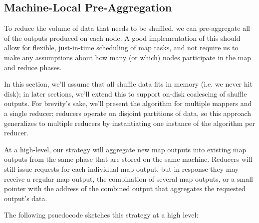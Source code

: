 \documentclass[12pt]{article}
\begin{document}
\subsection{Machine-Local Pre-Aggregation}

To reduce the volume of data that needs to be shuffled, we can pre-aggregate
all of the outputs produced on each node.  A good implementation of this
should allow for flexible, just-in-time scheduling of map tasks, and not
require us to make any assumptions about how many (or which) nodes participate
in the map and reduce phases.

In this section, we'll assume that all shuffle data fits in memory (i.e. we
never hit disk); in later sections, we'll extend this to support on-disk
coalescing of shuffle outputs.  For brevity's sake, we'll present the
algorithm for multiple mappers and a single reducer; reducers operate on
disjoint partitions of data, so this approach generalizes to multiple reducers
by instantiating one instance of the algorithm per reducer.

At a high-level, our strategy will aggregate new map outputs into existing map
outputs from the same phase that are stored on the same machine.  Reducers will
still issue requests for each individual map output, but in response they may
receive a regular map output, the combination of several map outputs, or a
small pointer with the address of the combined output that aggregates the
requested output's data.

The following psuedocode sketches this strategy at a high level:
\end{document}
